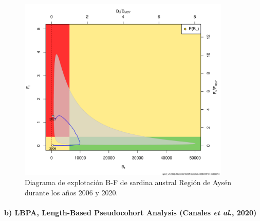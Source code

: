 \documentclass[
  spanish,
]{article}
\begin{document}
\pagebreak

\begin{figure}[h!]
\centering
\includegraphics[width=0.9\textwidth]{SPiCT/Figuras/Salidas 2-1.pdf}
\caption{Diagrama de explotación B-F de sardina austral Región de Aysén durante los años 2006 y 2020.}
\label{Fig20}
\end{figure}

\pagebreak

\hypertarget{b-lbpa-length-based-pseudocohort-analysis-canales-et-al.-2020-1}{%
\paragraph{\texorpdfstring{b) LBPA, Length-Based Pseudocohort Analysis
(Canales \emph{et al}.,
2020)}{b) LBPA, Length-Based Pseudocohort Analysis (Canales et al., 2020)}}\label{b-lbpa-length-based-pseudocohort-analysis-canales-et-al.-2020-1}}

\quad
\end{document}
